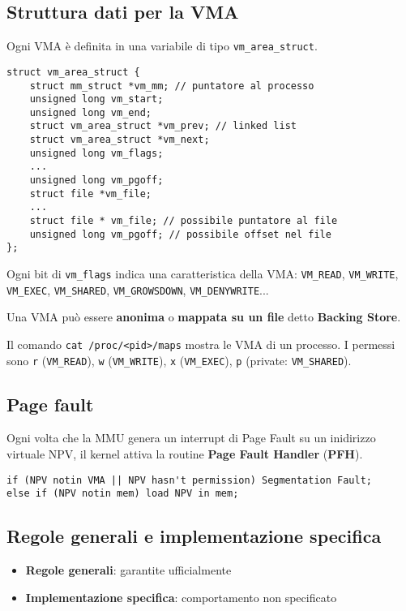 \documentclass[12pt, a4paper]{report}
\begin{document}
\subsection{Struttura dati per la VMA}
Ogni VMA è definita in una variabile di tipo \texttt{vm\_area\_struct}.
\begin{verbatim}
struct vm_area_struct {
    struct mm_struct *vm_mm; // puntatore al processo
    unsigned long vm_start;
    unsigned long vm_end;
    struct vm_area_struct *vm_prev; // linked list
    struct vm_area_struct *vm_next;
    unsigned long vm_flags;
    ...
    unsigned long vm_pgoff;
    struct file *vm_file;
    ...
    struct file * vm_file; // possibile puntatore al file
    unsigned long vm_pgoff; // possibile offset nel file
};
\end{verbatim}
Ogni bit di \texttt{vm\_flags} indica una caratteristica della VMA:
\texttt{VM\_READ}, \texttt{VM\_WRITE}, \texttt{VM\_EXEC}, \texttt{VM\_SHARED},
\texttt{VM\_GROWSDOWN}, \texttt{VM\_DENYWRITE}...

Una VMA può essere \textbf{anonima} o \textbf{mappata su un file} detto
\textbf{Backing Store}.

Il comando \texttt{cat /proc/<pid>/maps} mostra le VMA di un processo. I
permessi sono \texttt{r} (\texttt{VM\_READ}), \texttt{w} (\texttt{VM\_WRITE}),
\texttt{x} (\texttt{VM\_EXEC}), \texttt{p} (private: \texttt{VM\_SHARED}).

\subsection{Page fault}
Ogni volta che la MMU genera un interrupt di Page Fault su un inidirizzo
virtuale NPV, il kernel attiva la routine \textbf{Page Fault Handler}
(\textbf{PFH}).
\begin{verbatim}
if (NPV notin VMA || NPV hasn't permission) Segmentation Fault;
else if (NPV notin mem) load NPV in mem;
\end{verbatim}

\subsection{Regole generali e implementazione specifica}
\begin{itemize}
	\item \textbf{Regole generali}: garantite ufficialmente
	\item \textbf{Implementazione specifica}: comportamento non specificato
\end{itemize}
\end{document}
